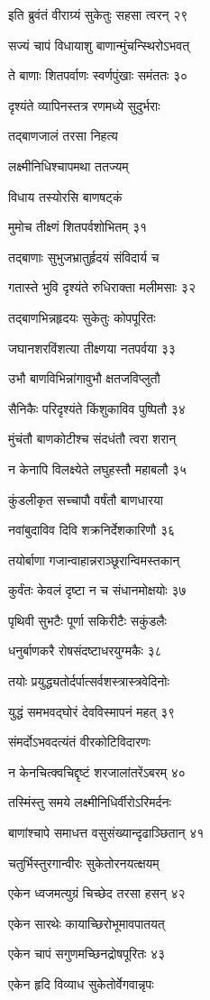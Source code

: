 इति ब्रुवंतं वीराग्र्यं सुकेतुः सहसा त्वरन् २९

सज्यं चापं विधायाशु बाणान्मुंचन्स्थिरोऽभवत्

ते बाणाः शितपर्वाणः स्वर्णपुंखाः समंततः ३०

दृश्यंते व्यापिनस्तत्र रणमध्ये सुदुर्भराः

तद्बाणजालं तरसा निहत्य

लक्ष्मीनिधिश्चापमथा ततज्यम्

विधाय तस्योरसि बाणषट्कं

मुमोच तीक्ष्णं शितपर्वशोभितम् ३१

तद्बाणाः सुभुजभ्रातुर्हृदयं संविदार्य च

गतास्ते भुवि दृश्यंते रुधिराक्ता मलीमसाः ३२

तद्बाणभिन्नहृदयः सुकेतुः कोपपूरितः

जघानशरविंशत्या तीक्ष्णया नतपर्वया ३३

उभौ बाणविभिन्नांगावुभौ क्षतजविप्लुतौ

सैनिकैः परिदृश्यंते किंशुकाविव पुष्पितौ ३४

मुंचंतौ बाणकोटीश्च संदधंतौ त्वरा शरान्

न केनापि विलक्ष्येते लघुहस्तौ महाबलौ ३५

कुंडलीकृत सच्चापौ वर्षंतौ बाणधारया

नवांबुदाविव दिवि शक्रनिर्देशकारिणौ ३६

तयोर्बाणा गजान्वाहान्नराञ्छूरान्विमस्तकान्

कुर्वंतः केवलं दृष्टा न च संधानमोक्षयोः ३७

पृथिवी सुभटैः पूर्णा सकिरीटैः सकुंडलैः

धनुर्बाणकरै रोषसंदष्टाधरयुग्मकैः ३८

तयोः प्रयुद्ध्यतोर्दर्पात्सर्वशस्त्रास्त्रवेदिनोः

युद्धं समभवद्घोरं देवविस्मापनं महत् ३९

संमर्दोऽभवदत्यंतं वीरकोटिविदारणः

न केनचित्क्वचिद्दृष्टं शरजालांतरेंऽबरम् ४०

तस्मिंस्तु समये लक्ष्मीनिधिर्वीरोऽरिमर्दनः

बाणांश्चापे समाधत्त वसुसंख्यान्दृढाञ्छितान् ४१

चतुर्भिस्तुरगान्वीरः सुकेतोरनयत्क्षयम्

एकेन ध्वजमत्युग्रं चिच्छेद तरसा हसन् ४२

एकेन सारथेः कायाच्छिरोभूमावपातयत्

एकेन चापं सगुणमच्छिनद्रोषपूरितः ४३

एकेन हृदि विव्याध सुकेतोर्वेगवान्नृपः

